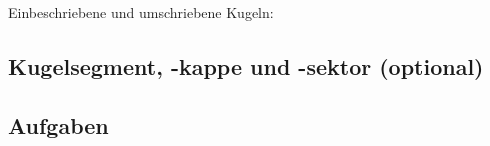 Einbeschriebene und umschriebene Kugeln:

\newpage

\subsection{Kugelsegment, -kappe und -sektor (optional)}


\subsection*{Aufgaben}
\newpage

